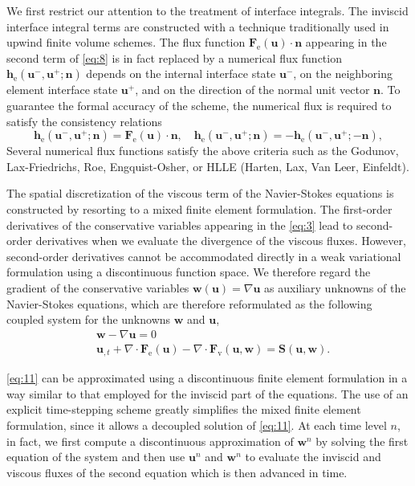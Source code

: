 \documentclass{develop-note}
\begin{document}
We first restrict our attention to the treatment of interface integrals. The inviscid interface integral terms are constructed with a technique traditionally used in upwind finite volume schemes. The flux function $\mathbf{F}_{\mathrm{e}}(\mathbf{u})\cdot\mathbf{n}$ appearing in the second term of \autoref{eq:8} is in fact replaced by a numerical flux function $\mathbf{h}_{\mathrm{e}}(\mathbf{u}^{-},\mathbf{u}^{+};\mathbf{n})$ depends on the internal interface state $\mathbf{u}^{-}$, on the neighboring element interface state $\mathbf{u}^{+}$, and on the direction of the normal unit vector $\mathbf{n}$. To guarantee the formal accuracy of the scheme, the numerical flux is required to satisfy the consistency relations
\begin{equation}
  \label{eq:10}
  \mathbf{h}_{\mathrm{e}}(\mathbf{u}^{-},\mathbf{u}^{+};\mathbf{n})=\mathbf{F}_{\mathrm{e}}(\mathbf{u})\cdot\mathbf{n},\quad\mathbf{h}_{\mathrm{e}}(\mathbf{u}^{-},\mathbf{u}^{+};\mathbf{n})=-\mathbf{h}_{\mathrm{e}}(\mathbf{u}^{-},\mathbf{u}^{+};-\mathbf{n}),
\end{equation}
Several numerical flux functions satisfy the above criteria such as the Godunov, Lax-Friedrichs, Roe, Engquist-Osher, or HLLE (Harten, Lax, Van Leer, Einfeldt).

The spatial discretization of the viscous term of the Navier-Stokes equations is constructed by resorting to a mixed finite element formulation. The first-order derivatives of the conservative variables appearing in the \autoref{eq:3} lead to second-order derivatives when we evaluate the divergence of the viscous fluxes. However, second-order derivatives cannot be accommodated directly in a weak variational formulation using a discontinuous function space. We therefore regard the gradient of the conservative variables $\mathbf{w}(\mathbf{u})=\nabla\mathbf{u}$ as auxiliary unknowns of the Navier-Stokes equations, which are therefore reformulated as the following coupled system for the unknowns $\mathbf{w}$ and $\mathbf{u}$,
\begin{equation}
  \label{eq:11}
  \begin{aligned}
    &\mathbf{w}-\nabla\mathbf{u}=0\\
    &\mathbf{u}_{,t}+\nabla\cdot\mathbf{F}_{\mathrm{e}}(\mathbf{u})-\nabla\cdot\mathbf{F}_{\mathrm{v}}(\mathbf{u},\mathbf{w})=\mathbf{S}(\mathbf{u},\mathbf{w}).
  \end{aligned}
\end{equation}

\autoref{eq:11} can be approximated using a discontinuous finite element formulation in a way similar to that employed for the inviscid part of the equations. The use of an explicit time-stepping scheme greatly simplifies the mixed finite element formulation, since it allows a decoupled solution of \autoref{eq:11}. At each time level $n$, in fact, we first compute a discontinuous approximation of $\mathbf{w}^{n}$ by solving the first equation of the system and then use $\mathbf{u}^{n}$ and $\mathbf{w}^{n}$ to evaluate the inviscid and viscous fluxes of the second equation which is then advanced in time.
\end{document}
